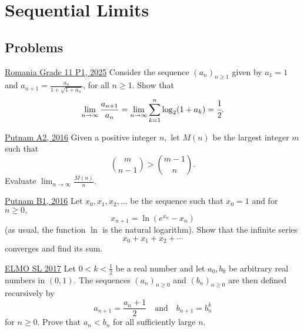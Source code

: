 \section{Sequential Limits}
\subsection{Problems}
\begin{problem}{1}{\href{https://artofproblemsolving.com/community/c7h3523176p34221514}{Romania Grade 11 P1, 2025}}
	Consider the sequence $(a_n)_{n\geq 1}$ given by $a_1=1$ and $a_{n+1}=\frac{a_n}{1+\sqrt{1+a_n}}$, for all $n\geq 1$. Show that$$\lim_{n\rightarrow\infty}\frac{a_{n+1}}{a_n} = \lim_{n\rightarrow\infty}\sum_{k=1}^n \log_2(1+a_k)=\cfrac{1}{2}.$$
\end{problem}

\begin{problem}{2}{\href{https://artofproblemsolving.com/community/q2h1349017p34784424}{Putnam A2, 2016}} Given a positive integer $n,$ let $M(n)$ be the largest integer $m$ such that
	\[\binom{m}{n-1}>\binom{m-1}{n}.\]
	Evaluate $\lim_{n\to\infty}\frac{M(n)}{n}.$
\end{problem}

\begin{problem}{3}{\href{https://artofproblemsolving.com/community/q1h1349023p34703591}{Putnam B1, 2016}} 
	Let $x_0,x_1,x_2,\dots$ be the sequence such that $x_0=1$ and for $n\ge 0,$
	\[x_{n+1}=\ln(e^{x_n}-x_n)\](as usual, the function $\ln$ is the natural logarithm). Show that the infinite series
	\[x_0+x_1+x_2+\cdots\]converges and find its sum.
\end{problem}

\begin{problem}{4}{\href{https://artofproblemsolving.com/community/c6h1472062p8547108}{ELMO SL 2017}} Let $0<k<\frac{1}{2}$ be a real number and let $a_0, b_0$ be arbitrary real numbers in $(0,1)$. The sequences $(a_n)_{n\ge 0}$ and $(b_n)_{n\ge 0}$ are then defined recursively by
		$$a_{n+1} = \dfrac{a_n+1}{2} \quad\text{and}\quad b_{n+1} = b_n^k$$
		for $n\ge 0$. Prove that $a_n<b_n$ for all sufficiently large $n$.
\end{problem}



\newpage
